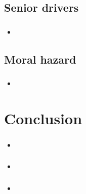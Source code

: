 \documentclass[dvipdfmx, 12pt]{beamer}
\begin{document}
\subsection{Senior drivers}
\begin{frame}\frametitle{}
	\begin{itemize}
	\item 
	\end{itemize}
\end{frame}

\subsection{Moral hazard}
\begin{frame}\frametitle{}
	\begin{itemize}
	\item 
	\end{itemize}
\end{frame}


\section{Conclusion}
\begin{frame}\frametitle{}
	\begin{itemize}
	\item 
	\end{itemize}
\end{frame}

\begin{frame}\frametitle{}
	\begin{itemize}
	\item 
	\end{itemize}
\end{frame}

\begin{frame}\frametitle{}
	\begin{itemize}
	\item 
	\end{itemize}
\end{frame}
\end{document}
